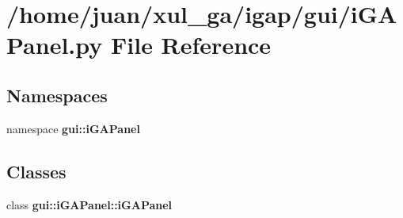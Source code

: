 \section{/home/juan/xul\_\-ga/igap/gui/iGAPanel.py File Reference}
\label{iGAPanel_8py}
\subsection*{Namespaces}
\begin{CompactItemize}
\item 
namespace {\bf gui::iGAPanel}
\end{CompactItemize}
\subsection*{Classes}
\begin{CompactItemize}
\item 
class {\bf gui::iGAPanel::iGAPanel}
\end{CompactItemize}
